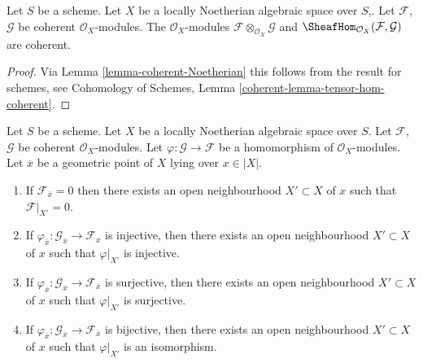 \begin{lemma}
\label{lemma-tensor-hom-coherent}
Let $S$ be a scheme.
Let $X$ be a locally Noetherian algebraic space over $S$,.
Let $\mathcal{F}$, $\mathcal{G}$ be coherent $\mathcal{O}_X$-modules.
The $\mathcal{O}_X$-modules $\mathcal{F} \otimes_{\mathcal{O}_X} \mathcal{G}$
and $\SheafHom_{\mathcal{O}_X}(\mathcal{F}, \mathcal{G})$ are
coherent.
\end{lemma}

\begin{proof}
Via Lemma \ref{lemma-coherent-Noetherian} this follows from the result
for schemes, see
Cohomology of Schemes, Lemma \ref{coherent-lemma-tensor-hom-coherent}.
\end{proof}

\begin{lemma}
\label{lemma-local-isomorphism}
Let $S$ be a scheme. Let $X$ be a locally Noetherian algebraic space over $S$.
Let $\mathcal{F}$, $\mathcal{G}$ be coherent $\mathcal{O}_X$-modules.
Let $\varphi : \mathcal{G} \to \mathcal{F}$ be a homomorphism
of $\mathcal{O}_X$-modules. Let $\overline{x}$ be a geometric point of $X$
lying over $x \in |X|$.
\begin{enumerate}
\item If $\mathcal{F}_{\overline{x}} = 0$ then there exists an open
neighbourhood $X' \subset X$ of $x$ such that $\mathcal{F}|_{X'} = 0$.
\item If $\varphi_{\overline{x}} : \mathcal{G}_{\overline{x}} \to
\mathcal{F}_{\overline{x}}$ is injective, then there exists an open
neighbourhood $X' \subset X$ of $x$ such that $\varphi|_{X'}$ is injective.
\item If $\varphi_{\overline{x}} : \mathcal{G}_{\overline{x}} \to
\mathcal{F}_{\overline{x}}$ is surjective, then there exists an open
neighbourhood $X' \subset X$ of $x$ such that $\varphi|_{X'}$ is surjective.
\item If $\varphi_{\overline{x}} : \mathcal{G}_{\overline{x}} \to
\mathcal{F}_{\overline{x}}$ is bijective, then there exists an open
neighbourhood $X' \subset X$ of $x$ such that $\varphi|_{X'}$ is an isomorphism.
\end{enumerate}
\end{lemma}

